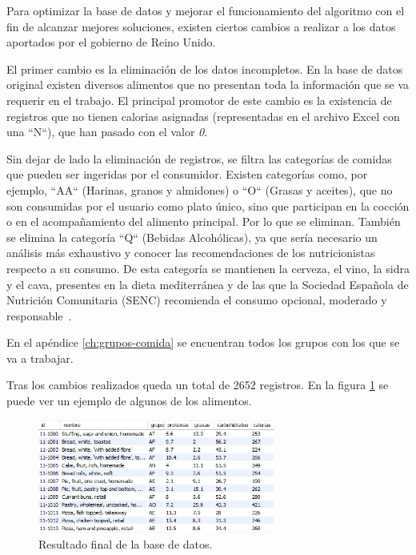 Para optimizar la base de datos y mejorar el funcionamiento del algoritmo con el fin de alcanzar mejores soluciones, existen ciertos cambios a realizar a los datos aportados por el gobierno de Reino Unido.

El primer cambio es la eliminación de los datos incompletos. En la base de datos original existen diversos alimentos que no presentan toda la información que se va requerir en el trabajo. El principal promotor de este cambio es la existencia de registros que no tienen calorias asignadas (representadas en el archivo Excel con una ``N``), que han pasado con el valor \textit{0}.

Sin dejar de lado la eliminación de registros, se filtra las categorías de comidas que pueden ser ingeridas por el consumidor. Existen categorías como, por ejemplo, ``AA`` (Harinas, granos y almidones) o ``O`` (Grasas y aceites), que no son consumidas por el usuario como plato único, sino que participan en la cocción o en el acompañamiento del alimento principal. Por lo que se eliminan. También se elimina la categoría ``Q`` (Bebidas Alcohólicas), ya que sería necesario un análisis más exhaustivo y conocer las recomendaciones de los nutricionistas respecto a su consumo. De esta categoría se mantienen la cerveza, el vino, la sidra y el cava, presentes en la dieta mediterránea y de las que la Sociedad Española de Nutrición Comunitaria (SENC) recomienda el consumo opcional, moderado y responsable~\cite{senpiramide}.

En el apéndice \ref{ch:grupos-comida} se encuentran todos los grupos con los que se va a trabajar.

Tras los cambios realizados queda un total de 2652 registros. En la figura \ref{fig:ejemplo} se puede ver un ejemplo de algunos de los alimentos.

\begin{figure}[H]
    \centering
    \includegraphics[width=0.695\textwidth]{figures/ejemplo.png}
    \caption{Resultado final de la base de datos.}
    \label{fig:ejemplo}
\end{figure}

